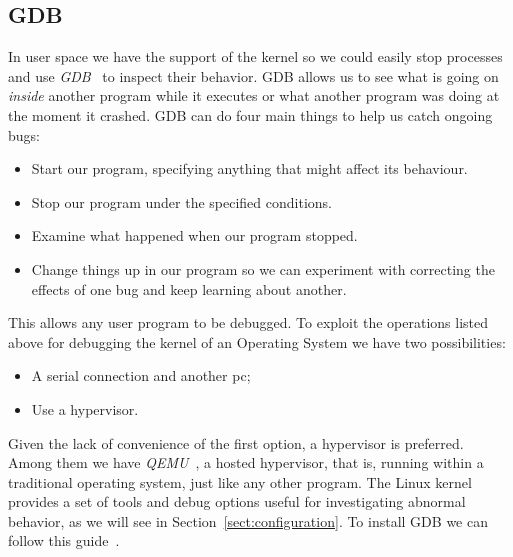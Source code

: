 \documentclass{masterthesis}
\newcommand{\refToSection}[1]{Section~\ref{sect:#1}\xspace}
\begin{document}
\subsection{GDB}
\label{subsect:gdb}
In user space we have the support of the kernel so we could easily stop processes and use \emph{GDB}~\cite{stallman1988debugging} to inspect their behavior.
GDB allows us to see what is going on \emph{inside} another program while it executes or what another program was doing at the moment it crashed.
GDB can do four main things to help us catch ongoing bugs:
\begin{itemize}
\item Start our program, specifying anything that might affect its behaviour.
\item Stop our program under the specified conditions.
\item Examine what happened when our program stopped.
\item Change things up in our program so we can experiment with correcting the effects of one bug and keep learning about another.
\end{itemize}
This allows any user program to be debugged.
To exploit the operations listed above for debugging the kernel of an Operating System we have two possibilities:
\begin{itemize}
\item A serial connection and another pc;
\item Use a hypervisor.
\end{itemize}
Given the lack of convenience of the first option, a hypervisor is preferred.
Among them we have \emph{QEMU}~\cite{bellard2005QEMU}, a hosted hypervisor, that is, running within a traditional operating system, just like any other program.
The Linux kernel provides a set of tools and debug options useful for investigating abnormal behavior, as we will see in \refToSection{configuration}.
To install GDB we can follow this guide~\cite{gdbinstall}. 
\end{document}
